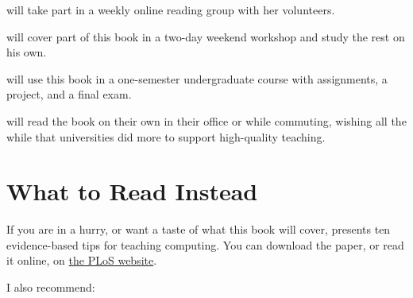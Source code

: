 \begin{description}
\tightlist
\item[Emily]
will take part in a weekly online reading group with her volunteers.
\item[Moshe]
will cover part of this book in a two-day weekend workshop and study
the rest on his own.
\item[Samira]
will use this book in a one-semester undergraduate course with
assignments, a project, and a final exam.
\item[Gene]
will read the book on their own in their office or while commuting,
wishing all the while that universities did more to support
high-quality teaching.
\end{description}

\section{What to Read Instead}\label{s:intro-instead}

If you are in a hurry, or want a taste of what this book will cover,
\cite{Brow2018} presents ten evidence-based tips for teaching
computing. You can download the paper, or read it online, on \href{https://doi.org/10.1371/journal.pcbi.1006023}{the PLoS
website}.

I also recommend:

